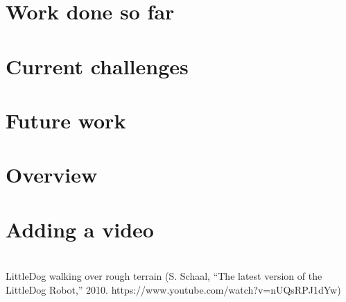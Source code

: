 \documentclass[%
    fourtothree=true, %
    DepLogo=true     %
    ]{ETHpres}
\begin{document}
%

\clearpage

\ETHslide
\section*{Work done so far}


\clearpage

\ETHslide
\section*{Current challenges}


\clearpage

\ETHslide
\section*{Future work}


\clearpage




\ETHslide
\section*{Overview}
\tableofcontents

\clearpage

\ETHslide
\section*{Adding a video}
\\
		\footnotesize{LittleDog walking over rough terrain (S. Schaal, ``The latest version of the LittleDog Robot,'' 2010. https://www.youtube.com/watch?v=nUQsRPJ1dYw)}

			
\clearpage


\ETHslide
\end{document}
